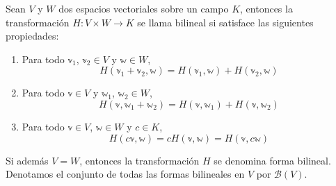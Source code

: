 \begin{definition}
    Sean $V$ y $W$ dos espacios vectoriales sobre un campo $K$, entonces la transformación $H: V \times W \longrightarrow K$ se llama bilineal si satisface las siguientes propiedades:
    \begin{enumerate}[label=\roman*)]
        \item Para todo $\mathbb{v}_1$, $\mathbb{v}_2 \in V$ y $\mathbb{w} \in W$,
        $$H(\mathbb{v}_1 + \mathbb{v}_2, \mathbb{w}) = H(\mathbb{v}_1, \mathbb{w}) + H(\mathbb{v}_2, \mathbb{w})$$\newpage
        \item Para todo $\mathbb{v} \in V$ y $\mathbb{w}_1$, $\mathbb{w}_2 \in W$,
        $$H(\mathbb{v}, \mathbb{w}_1 + \mathbb{w}_2) = H(\mathbb{v}, \mathbb{w}_1) + H(\mathbb{v}, \mathbb{w}_2)$$
        \item Para todo $\mathbb{v} \in V$, $\mathbb{w} \in W$ y $c \in K$,
        $$H(c\mathbb{v}, \mathbb{w}) = cH(\mathbb{v}, \mathbb{w}) = H(\mathbb{v}, c\mathbb{w})$$
    \end{enumerate}
    Si además $V = W$, entonces la transformación $H$ se denomina forma bilineal. Denotamos el conjunto de todas las formas bilineales en $V$ por $\mathcal{B}(V)$.
\end{definition}

